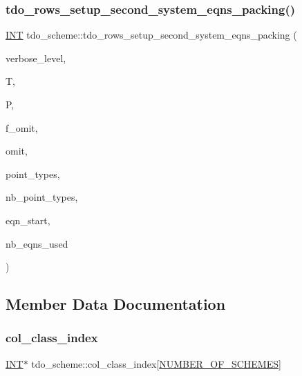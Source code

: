 \subsubsection{\texorpdfstring{tdo\+\_\+rows\+\_\+setup\+\_\+second\+\_\+system\+\_\+eqns\+\_\+packing()}{tdo\_rows\_setup\_second\_system\_eqns\_packing()}}
{\footnotesize\ttfamily \mbox{\hyperlink{galois_8h_a09fddde158a3a20bd2dcadb609de11dc}{I\+NT}} tdo\+\_\+scheme\+::tdo\+\_\+rows\+\_\+setup\+\_\+second\+\_\+system\+\_\+eqns\+\_\+packing (\begin{DoxyParamCaption}\item[{\mbox{\hyperlink{galois_8h_a09fddde158a3a20bd2dcadb609de11dc}{I\+NT}}}]{verbose\+\_\+level,  }\item[{\mbox{\hyperlink{classtdo__data}{tdo\+\_\+data}} \&}]{T,  }\item[{\mbox{\hyperlink{classpartitionstack}{partitionstack}} \&}]{P,  }\item[{\mbox{\hyperlink{galois_8h_a09fddde158a3a20bd2dcadb609de11dc}{I\+NT}}}]{f\+\_\+omit,  }\item[{\mbox{\hyperlink{galois_8h_a09fddde158a3a20bd2dcadb609de11dc}{I\+NT}}}]{omit,  }\item[{\mbox{\hyperlink{galois_8h_a09fddde158a3a20bd2dcadb609de11dc}{I\+NT}} $\ast$}]{point\+\_\+types,  }\item[{\mbox{\hyperlink{galois_8h_a09fddde158a3a20bd2dcadb609de11dc}{I\+NT}}}]{nb\+\_\+point\+\_\+types,  }\item[{\mbox{\hyperlink{galois_8h_a09fddde158a3a20bd2dcadb609de11dc}{I\+NT}}}]{eqn\+\_\+start,  }\item[{\mbox{\hyperlink{galois_8h_a09fddde158a3a20bd2dcadb609de11dc}{I\+NT}} \&}]{nb\+\_\+eqns\+\_\+used }\end{DoxyParamCaption})}



\subsection{Member Data Documentation}
\mbox{\label{classtdo__scheme_a9f7718f3e0f6af87117100b4d40dfa54}} 
\subsubsection{\texorpdfstring{col\+\_\+class\+\_\+index}{col\_class\_index}}
{\footnotesize\ttfamily \mbox{\hyperlink{galois_8h_a09fddde158a3a20bd2dcadb609de11dc}{I\+NT}}$\ast$ tdo\+\_\+scheme\+::col\+\_\+class\+\_\+index\mbox{[}\mbox{\hyperlink{incidence_8h_a27f25725c4772efe473058135daeba55}{N\+U\+M\+B\+E\+R\+\_\+\+O\+F\+\_\+\+S\+C\+H\+E\+M\+ES}}\mbox{]}}

